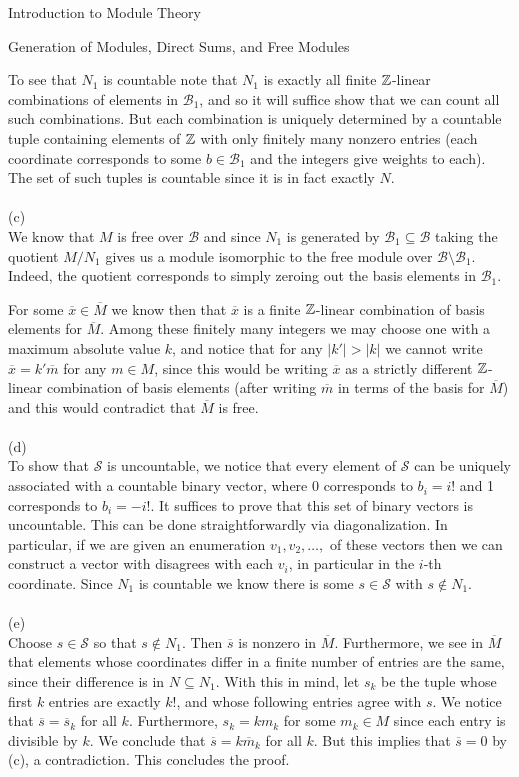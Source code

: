 \begin{chapter}{Introduction to Module Theory}
\begin{section}{Generation of Modules, Direct Sums, and Free Modules}
\begin{solution}
To see that $N_1$ is countable note that $N_1$ is exactly all finite $\mathbb{Z}$-linear combinations of elements in $\mathcal B_1$, and so it will suffice show that we can count all such combinations. But each combination is uniquely determined by a countable tuple containing elements of $\mathbb{Z}$ with only finitely many nonzero entries (each coordinate corresponds to some $b\in\mathcal B_1$ and the integers give weights to each). The set of such tuples is countable since it is in fact exactly $N$. \\\\
(c)\\
We know that $M$ is free over $\mathcal B$ and since $N_1$ is generated by $\mathcal B_1\subseteq \mathcal B$ taking the quotient $M/N_1$ gives us a module isomorphic to the free module over $\mathcal B\setminus \mathcal B_1$. Indeed, the quotient corresponds to simply zeroing out the basis elements in $\mathcal B_1$.

For some $\overline x \in\overline M$ we know then that $\overline x$ is a finite $\mathbb{Z}$-linear combination of basis elements for $\overline M$. Among these finitely many integers we may choose one with  a maximum absolute value $k$, and notice that for any $|k'|>|k|$ we cannot write $\overline x = k'\overline m$ for any $m\in M$, since this would be writing $\overline x$ as a strictly different $\mathbb{Z}$-linear combination of basis elements (after writing $\overline m$ in terms of the basis for $\overline M$) and this would contradict that $\overline M$ is free.\\\\
(d)\\
To show that $\mathcal S$ is uncountable, we notice that every element of $\mathcal S$ can be uniquely associated with a countable binary vector, where $0$ corresponds to $b_i = i!$ and 1 corresponds to $b_i = -i!$. It suffices to prove that this set of binary vectors is uncountable. This can be done straightforwardly via diagonalization. In particular, if we are given an enumeration $v_1,v_2,\ldots,$ of these vectors then we can construct a vector with disagrees with each $v_i$, in particular in the $i$-th coordinate. Since $N_1$ is countable we know there is some $s\in \mathcal S$ with $s\notin N_1$. \\\\
(e)\\
Choose $s\in\mathcal S$ so that $s\notin N_1$. Then $\overline s$ is nonzero in $\overline M$. Furthermore, we see in $\overline M$ that elements whose coordinates differ in a finite number of entries are the same, since their difference is in $N\subseteq N_1$. With this in mind, let $s_k$ be the tuple whose first $k$ entries are exactly $k!$, and whose following entries agree with $s$. We notice that $\overline s = \overline s_k$ for all $k$. 
Furthermore, $s_k = km_k$ for some $m_k\in M$ since each entry is divisible by $k$. We conclude that $\overline s = k\overline m_k$ for all $k$. But this implies that $\overline s = 0$ by (c), a contradiction. This concludes the proof.


\end{solution}
\end{section}
\end{chapter}
